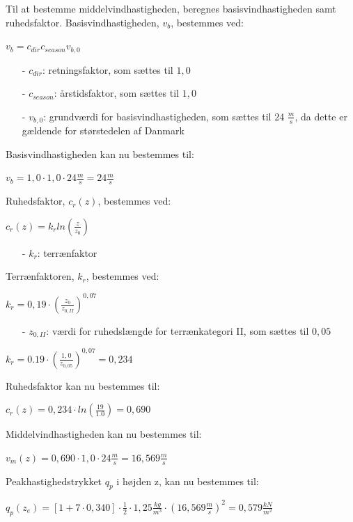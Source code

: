 Til at bestemme middelvindhastigheden, beregnes basisvindhastigheden samt ruhedsfaktor.
\newline
\newline
Basisvindhastigheden, $v_b$, bestemmes ved:
\begin{center}
$v_b=c_{dir}c_{season}v_{b,0}$
\end{center}
\begin{itemize}
	\item[-] $c_{dir}$: retningsfaktor, som sættes til $1,\!0$ \citep[ tabel 1a kapitel 4.2]{EU91}
	\item[-] $c_{season}$: årstidsfaktor, som sættes til $1,\!0$ \citep[ tabel 1b kapitel 4.2]{EU91}
	\item[-] $v_{b,0}$: grundværdi for basisvindhastigheden, som sættes til 24 $\frac{m}{s}$, da dette er gældende for størstedelen af Danmark \citep[ kapitel 4.2]{EU91}
\end{itemize}
Basisvindhastigheden kan nu bestemmes til:
\begin{center}
$v_b=1,\!0\cdot 1,\!0\cdot 24 \frac{m}{s}=24 \frac{m}{s}$
\end{center}
Ruhedsfaktor, $c_r(z)$, bestemmes ved:
\begin{center}
$c_r(z)=k_rln(\frac{z}{z_0})$
\end{center}
\begin{itemize}
	\item[-] $k_r$: terrænfaktor
\end{itemize}
Terrænfaktoren, $k_r$, bestemmes ved:
\begin{center}
$k_r=0,\!19\cdot (\frac{z_0}{z_{0,II}})^{0,\!07}$
\end{center}
\begin{itemize}
	\item[-] $z_{0,II}$: værdi for ruhedslængde for terrænkategori II, som sættes til $0,\!05$ \citep[ kapitel 4.3.2]{EU91}
\end{itemize}
\begin{center}
$k_r=0.19\cdot (\frac{1,\!0}{z_{0,\!05}})^{0,\!07}=0,\!234$
\end{center}
Ruhedsfaktor kan nu bestemmes til:
\begin{center}
$c_r(z)=0,\!234\cdot ln(\frac{19}{1.0})=0,\!690$
\end{center}
Middelvindhastigheden kan nu bestemmes til:
\begin{center}
$v_m(z)=0,\!690\cdot 1,\!0\cdot 24 \frac{m}{s}=16,\!569 \frac{m}{s}$
\end{center}
Peakhastighedstrykket $q_p$ i højden z, kan nu bestemmes til:
\begin{center}
$q_p(z_e)=[1+7\cdot 0,\!340]\cdot \frac{1}{2}\cdot 1,\!25 \frac{kg}{m^3}\cdot (16,\!569 \frac{m}{s})^2=0,\!579 \frac{kN}{m^2}$
\end{center}

